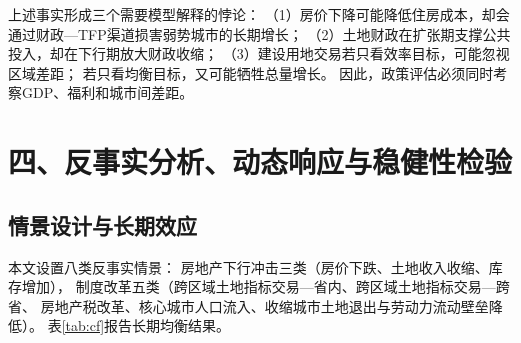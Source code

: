 \documentclass[UTF8,a4paper,12pt]{ctexart}
\theoremstyle{plain}
\theoremstyle{definition}
\theoremstyle{remark}
\begin{document}
上述事实形成三个需要模型解释的悖论：
（1）房价下降可能降低住房成本，却会通过财政—TFP渠道损害弱势城市的长期增长；
（2）土地财政在扩张期支撑公共投入，却在下行期放大财政收缩；
（3）建设用地交易若只看效率目标，可能忽视区域差距；
若只看均衡目标，又可能牺牲总量增长。
因此，政策评估必须同时考察GDP、福利和城市间差距。

\section{四、反事实分析、动态响应与稳健性检验}

\subsection{情景设计与长期效应}

本文设置八类反事实情景：
房地产下行冲击三类（房价下跌、土地收入收缩、库存增加），
制度改革五类（跨区域土地指标交易—省内、跨区域土地指标交易—跨省、
房地产税改革、核心城市人口流入、收缩城市土地退出与劳动力流动壁垒降低）。
表\ref{tab:cf}报告长期均衡结果。
\end{document}
